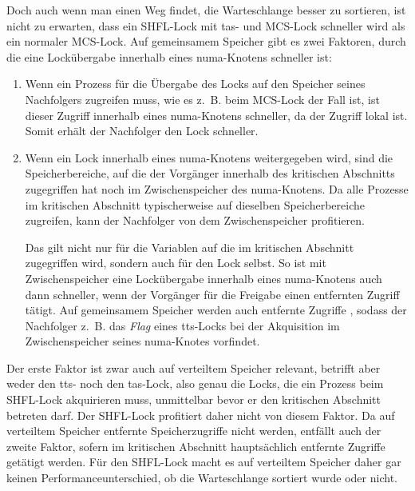 Doch auch wenn man einen Weg findet,
die Warteschlange besser zu sortieren,
ist nicht zu erwarten,
dass ein SHFL-Lock mit \gls{tas}- und MCS-Lock schneller wird
als ein normaler MCS-Lock.
Auf gemeinsamem Speicher gibt es zwei Faktoren,
durch die eine Lockübergabe innerhalb eines \gls{numa}-Knotens schneller ist:
\begin{enumerate}
    \item Wenn ein Prozess
          für die Übergabe des Locks
          auf den Speicher seines Nachfolgers zugreifen muss,
          wie es z.~B. beim MCS-Lock der Fall ist,
          ist dieser Zugriff innerhalb eines \gls{numa}-Knotens schneller,
          da der Zugriff lokal ist.
          Somit erhält der Nachfolger den Lock schneller.
    \item Wenn ein Lock innerhalb eines \gls{numa}-Knotens weitergegeben wird,
          sind die Speicherbereiche,
          auf die der Vorgänger innerhalb des kritischen Abschnitts zugegriffen hat
          noch im \gls{Zwischenspeicher} des \gls{numa}-Knotens.
          Da alle Prozesse im kritischen Abschnitt typischerweise auf dieselben Speicherbereiche zugreifen,
          kann der Nachfolger von dem \gls{Zwischenspeicher} profitieren.

          Das gilt nicht nur für die Variablen
          auf die im kritischen Abschnitt zugegriffen wird,
          sondern auch für den Lock selbst.
          So ist mit \gls{Zwischenspeicher} eine Lockübergabe innerhalb eines \gls{numa}-Knotens
          auch dann schneller,
          wenn der Vorgänger für die Freigabe einen entfernten Zugriff tätigt.
          Auf gemeinsamem Speicher werden auch entfernte Zugriffe ,
          sodass der Nachfolger
          z.~B. das \textit{Flag} eines \gls{tts}-Locks
          bei der Akquisition
          im \gls{Zwischenspeicher} seines \gls{numa}-Knotes vorfindet.
\end{enumerate}
Der erste Faktor ist zwar auch auf verteiltem Speicher relevant,
betrifft aber weder den \gls{tts}- noch den \gls{tas}-Lock,
also genau die Locks,
die ein Prozess beim SHFL-Lock akquirieren muss,
unmittelbar bevor er den kritischen Abschnitt betreten darf.
Der SHFL-Lock profitiert daher nicht von diesem Faktor.
Da auf verteiltem Speicher entfernte Speicherzugriffe nicht  werden,
entfällt auch der zweite Faktor,
sofern im kritischen Abschnitt hauptsächlich entfernte Zugriffe getätigt werden.
Für den SHFL-Lock macht es auf verteiltem Speicher daher gar keinen Performanceunterschied,
ob die Warteschlange sortiert wurde oder nicht.
